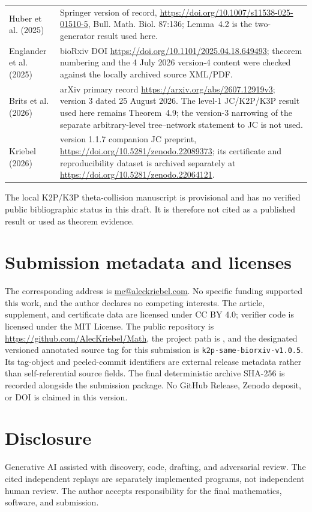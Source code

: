 \documentclass[11pt]{article}
\theoremstyle{remark}
\begin{document}
\begin{center}
\begin{tabular}{L{.27\linewidth}L{.63\linewidth}}
Huber et al. (2025) \cite{HuberEtAl2025}
& Springer version of record,
\url{https://doi.org/10.1007/s11538-025-01510-5}, Bull. Math. Biol. 87:136;
Lemma~4.2 is the two-generator result used here.\\
Englander et al. (2025) \cite{EnglanderEtAl2026}
& bioRxiv DOI \url{https://doi.org/10.1101/2025.04.18.649493}; theorem
numbering and the 4 July 2026 version-4 content were checked against the
locally archived source XML/PDF.\\
Brits et al. (2026) \cite{BritsEtAl2026}
& arXiv primary record \url{https://arxiv.org/abs/2607.12919v3}; version 3
dated 25 August 2026.  The level-1 JC/K2P/K3P result used here remains
Theorem~4.9; the version-3 narrowing of the separate arbitrary-level
tree--network statement to JC is not used.\\
Kriebel (2026) \cite{KriebelJC2026}
& version 1.1.7 companion JC preprint,
\url{https://doi.org/10.5281/zenodo.22089373}; its certificate and
reproducibility dataset is archived separately at
\url{https://doi.org/10.5281/zenodo.22064121}.\\
\bottomrule
\end{tabular}
\end{center}

The local K2P/K3P theta-collision manuscript is provisional and has no
verified public bibliographic status in this draft.  It is therefore not
cited as a published result or used as theorem evidence.

\section{Submission metadata and licenses}\label{sec:submission-metadata}

The corresponding address is \href{mailto:me@aleckriebel.com}
{me@aleckriebel.com}.  No specific funding supported this work, and the author
declares no competing interests.  The article, supplement, and certificate
data are licensed under CC BY 4.0; verifier code is licensed under the MIT
License.  The public repository is
\url{https://github.com/AlecKriebel/Math}, the project path is
, and the designated versioned
annotated source tag for this submission is
\texttt{k2p-same-biorxiv-v1.0.5}.  Its tag-object and peeled-commit identifiers
are external release metadata rather than self-referential source fields.  The
final deterministic archive SHA-256 is recorded alongside the submission
package.  No GitHub
Release, Zenodo deposit, or DOI is claimed in this version.

\section*{Disclosure}

Generative AI assisted with discovery, code, drafting, and adversarial review.
The cited independent replays are separately implemented programs, not
independent human review.  The author accepts responsibility for the final
mathematics, software, and submission.

{\small


}
\end{document}
